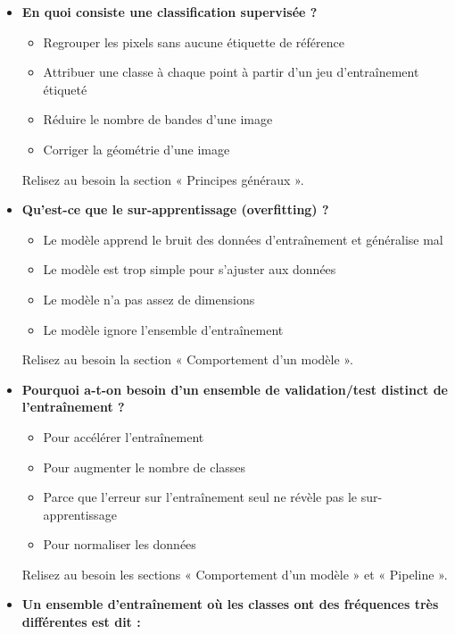 \documentclass[
  french,
  11pt,
  letterpaper,
  open=any,
  twoside=false,
  french]{scrbook}
\providecommand{\tightlist}{%
  \setlength{\itemsep}{0pt}\setlength{\parskip}{0pt}}
\begin{document}
\begin{itemize}
\item
  \textbf{En quoi consiste une classification supervisée ?}

  \begin{itemize}
  \tightlist
  \item
    Regrouper les pixels sans aucune étiquette de référence
  \item
    Attribuer une classe à chaque point à partir d'un jeu d'entraînement
    étiqueté
  \item
    Réduire le nombre de bandes d'une image
  \item
    Corriger la géométrie d'une image
  \end{itemize}

  Relisez au besoin la section « Principes généraux ».
\item
  \textbf{Qu'est-ce que le sur-apprentissage (overfitting) ?}

  \begin{itemize}
  \tightlist
  \item
    Le modèle apprend le bruit des données d'entraînement et généralise
    mal
  \item
    Le modèle est trop simple pour s'ajuster aux données
  \item
    Le modèle n'a pas assez de dimensions
  \item
    Le modèle ignore l'ensemble d'entraînement
  \end{itemize}

  Relisez au besoin la section « Comportement d'un modèle ».
\item
  \textbf{Pourquoi a-t-on besoin d'un ensemble de validation/test
  distinct de l'entraînement ?}

  \begin{itemize}
  \tightlist
  \item
    Pour accélérer l'entraînement
  \item
    Pour augmenter le nombre de classes
  \item
    Parce que l'erreur sur l'entraînement seul ne révèle pas le
    sur-apprentissage
  \item
    Pour normaliser les données
  \end{itemize}

  Relisez au besoin les sections « Comportement d'un modèle » et «
  Pipeline ».
\item
  \textbf{Un ensemble d'entraînement où les classes ont des fréquences
  très différentes est dit :}


\end{itemize}
\end{document}

